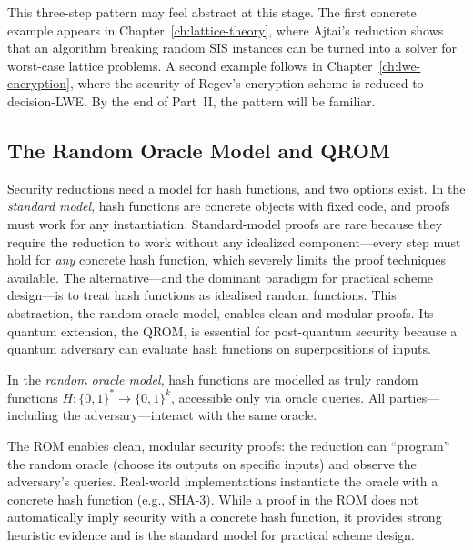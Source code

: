This three-step pattern may feel abstract at this stage.  The first concrete example appears in Chapter~\ref{ch:lattice-theory}, where Ajtai's reduction shows that an algorithm breaking random SIS instances can be turned into a solver for worst-case lattice problems.  A second example follows in Chapter~\ref{ch:lwe-encryption}, where the security of Regev's encryption scheme is reduced to decision-LWE.  By the end of Part~II, the pattern will be familiar.


\subsection{The Random Oracle Model and QROM}
\label{subsec:rom-qrom}

Security reductions need a model for hash functions, and two options exist.  In the \emph{standard model}, hash functions are concrete objects with fixed code, and proofs must work for any instantiation.  Standard-model proofs are rare because they require the reduction to work without any idealized component---every step must hold for \emph{any} concrete hash function, which severely limits the proof techniques available.  The alternative---and the dominant paradigm for practical scheme design---is to treat hash functions as idealised random functions.  This abstraction, the random oracle model, enables clean and modular proofs.  Its quantum extension, the QROM, is essential for post-quantum security because a quantum adversary can evaluate hash functions on superpositions of inputs.

\begin{definition}
\label{def:rom}
In the \emph{random oracle model}, hash functions are modelled as truly random functions $H : \{0,1\}^* \to \{0,1\}^k$, accessible only via oracle queries.  All parties---including the adversary---interact with the same oracle.
\end{definition}

The ROM enables clean, modular security proofs: the reduction can ``program'' the random oracle (choose its outputs on specific inputs) and observe the adversary's queries.  Real-world implementations instantiate the oracle with a concrete hash function (e.g., SHA-3).  While a proof in the ROM does not automatically imply security with a concrete hash function, it provides strong heuristic evidence and is the standard model for practical scheme design.

